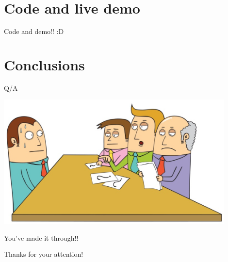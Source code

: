 \documentclass[10pt]{beamer}
\begin{document}
	
	\section{Code and live demo}
	
	\begin{frame}{Code and demo!! :D}
	\begin{center}
	\href{http://localhost:8888/notebooks/notebooks/Pycon9_MarkovChains.ipynb}{}
	\end{center}
	\end{frame}
	
	
	\section{Conclusions}
	
	\begin{frame}{Q/A}
		\begin{center}
		\includegraphics[width=0.9\textwidth]{imgs/qa.png}
		\end{center}
	\end{frame}	
	
	
	\begin{frame}{You've made it through!!}
		\begin{center}
		\Huge{Thanks for your attention!\\}
		\href{mailto:pietro_mascolo@optum.com}{}
		\end{center}
	\end{frame}
\end{document}
